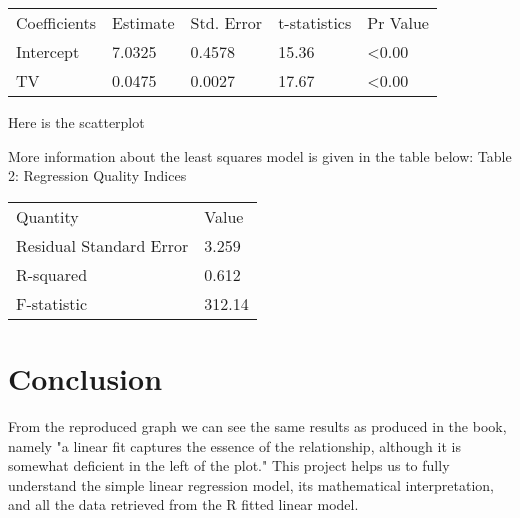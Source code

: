 \documentclass[a4paper]{article}
\begin{document}
\vspace{2mm}
\begin{tabular}{ | p{3cm} | p{2cm} | p{2cm} | p{2cm} | p{2cm} |}
  \hline			
  Coefficients & Estimate & Std. Error & t-statistics & Pr Value \\
  Intercept & 7.0325 & 0.4578 & 15.36 & <0.00 \\
  TV & 0.0475 & 0.0027 & 17.67 & <0.00 \\
  \hline  
\end{tabular}

\vspace{5mm}
Here is the scatterplot


\vspace{5mm}
More information about the least squares model is given in the table below: \newline
Table 2: Regression Quality Indices

\vspace{2mm}
\begin{tabular}{ | p{4cm} | p{2cm} | }
  \hline			
  Quantity & Value \\
  Residual Standard Error & 3.259 \\
  R-squared & 0.612 \\
  F-statistic & 312.14 \\
  \hline  
\end{tabular}

\section{Conclusion}
From the reproduced graph we can see the same results as produced in the book, namely "a linear fit captures the essence of the relationship, although it is somewhat deficient in the left of the plot." This project helps us to fully understand the simple linear regression model, its mathematical interpretation, and all the data retrieved from the R fitted linear model.
\end{document}
